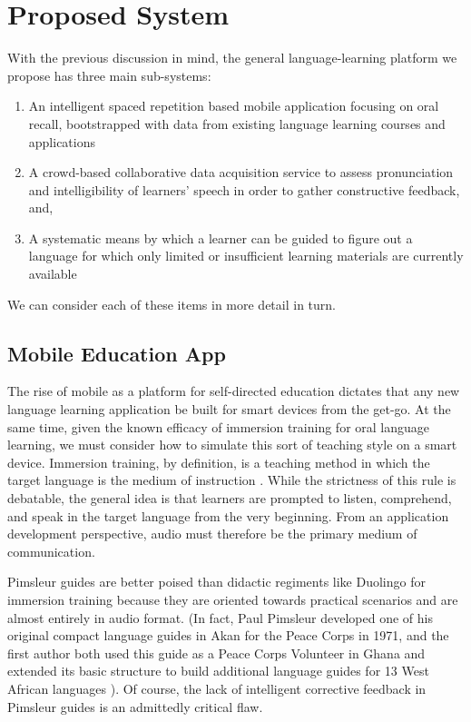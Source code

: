 \section{Proposed System} 
With the previous discussion in mind, the general language-learning platform we propose has three main sub-systems:
\begin{enumerate}
\item An intelligent spaced repetition based mobile application focusing on oral recall, bootstrapped with data from existing language learning courses and applications
\item A crowd-based collaborative data acquisition service to assess pronunciation and intelligibility of learners' speech in order to gather constructive feedback, and,
\item A systematic means by which a learner can be guided to figure out a language for which only limited or insufficient learning materials are currently available
\end{enumerate}

We can consider each of these items in more detail in turn.

\subsection{Mobile Education App}
The rise of mobile as a platform for self-directed education dictates that any new language learning application be built for smart devices from the get-go. At the same time, given the known efficacy of immersion training for oral language learning, we must consider how to simulate this sort of teaching style on a smart device. Immersion training, by definition, is a teaching method in which the target language is the medium of instruction \cite{baker19931}. While the strictness of this rule is debatable, the general idea is that learners are prompted to listen, comprehend, and speak in the target language from the very beginning. From an application development perspective, audio must therefore be the primary medium of communication.  

Pimsleur guides are better poised than didactic regiments like Duolingo for immersion training because they are oriented towards practical scenarios and are almost entirely in audio format. (In fact, Paul Pimsleur developed one of his original compact language guides in Akan for the Peace Corps in 1971, and the first author both used this guide as a Peace Corps Volunteer in Ghana and extended its basic structure to build additional language guides for 13 West African languages \cite{wolfeapplause} \cite{wikipimsleur} \cite{wolfeclap}). Of course, the lack of intelligent corrective feedback in Pimsleur guides is an admittedly critical flaw. 

